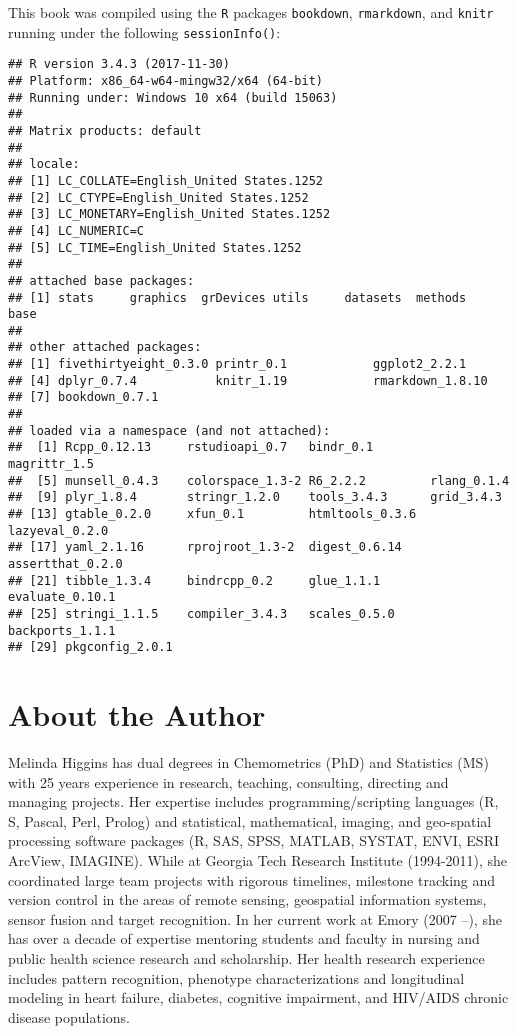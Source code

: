 \documentclass[]{book}
\theoremstyle{definition}
\theoremstyle{definition}
\theoremstyle{definition}
\theoremstyle{remark}
\begin{document}
This book was compiled using the \texttt{R} packages \texttt{bookdown},
\texttt{rmarkdown}, and \texttt{knitr} running under the following
\texttt{sessionInfo()}:

\begin{verbatim}
## R version 3.4.3 (2017-11-30)
## Platform: x86_64-w64-mingw32/x64 (64-bit)
## Running under: Windows 10 x64 (build 15063)
## 
## Matrix products: default
## 
## locale:
## [1] LC_COLLATE=English_United States.1252 
## [2] LC_CTYPE=English_United States.1252   
## [3] LC_MONETARY=English_United States.1252
## [4] LC_NUMERIC=C                          
## [5] LC_TIME=English_United States.1252    
## 
## attached base packages:
## [1] stats     graphics  grDevices utils     datasets  methods   base     
## 
## other attached packages:
## [1] fivethirtyeight_0.3.0 printr_0.1            ggplot2_2.2.1        
## [4] dplyr_0.7.4           knitr_1.19            rmarkdown_1.8.10     
## [7] bookdown_0.7.1       
## 
## loaded via a namespace (and not attached):
##  [1] Rcpp_0.12.13     rstudioapi_0.7   bindr_0.1        magrittr_1.5    
##  [5] munsell_0.4.3    colorspace_1.3-2 R6_2.2.2         rlang_0.1.4     
##  [9] plyr_1.8.4       stringr_1.2.0    tools_3.4.3      grid_3.4.3      
## [13] gtable_0.2.0     xfun_0.1         htmltools_0.3.6  lazyeval_0.2.0  
## [17] yaml_2.1.16      rprojroot_1.3-2  digest_0.6.14    assertthat_0.2.0
## [21] tibble_1.3.4     bindrcpp_0.2     glue_1.1.1       evaluate_0.10.1 
## [25] stringi_1.1.5    compiler_3.4.3   scales_0.5.0     backports_1.1.1 
## [29] pkgconfig_2.0.1
\end{verbatim}

\chapter*{About the Author}\label{about-the-author}


Melinda Higgins has dual degrees in Chemometrics (PhD) and Statistics
(MS) with 25 years experience in research, teaching, consulting,
directing and managing projects. Her expertise includes
programming/scripting languages (R, S, Pascal, Perl, Prolog) and
statistical, mathematical, imaging, and geo-spatial processing software
packages (R, SAS, SPSS, MATLAB, SYSTAT, ENVI, ESRI ArcView, IMAGINE).
While at Georgia Tech Research Institute (1994-2011), she coordinated
large team projects with rigorous timelines, milestone tracking and
version control in the areas of remote sensing, geospatial information
systems, sensor fusion and target recognition. In her current work at
Emory (2007 --), she has over a decade of expertise mentoring students
and faculty in nursing and public health science research and
scholarship. Her health research experience includes pattern
recognition, phenotype characterizations and longitudinal modeling in
heart failure, diabetes, cognitive impairment, and HIV/AIDS chronic
disease populations.
\end{document}
